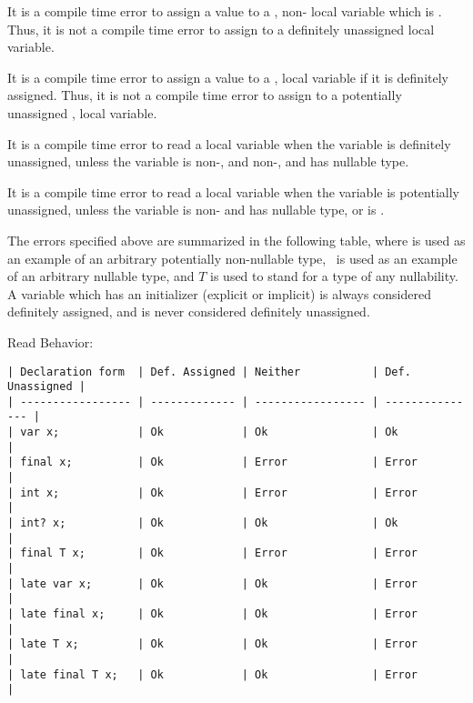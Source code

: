\documentclass[makeidx]{article}
\begin{document}
{It is a compile time error to assign a value to a \FINAL, non-\LATE{} local
variable which is .  Thus, it is not a compile time
error to assign to a definitely unassigned \FINAL{} local variable.

It is a compile time error to assign a value to a \FINAL, \LATE{} local variable
if it is definitely assigned. Thus, it is not a compile time error to
assign to a potentially unassigned \FINAL, \LATE{} local variable.


It is a compile time error to read a local variable when the variable is
definitely unassigned, unless the variable is non-\FINAL, and non-\LATE,
and has nullable type.

It is a compile time error to read a local variable when the variable is
potentially unassigned, unless the variable is non-\FINAL{} and has nullable
type, or is \LATE.

The errors specified above are summarized in the following table, where  is
used as an example of an arbitrary potentially non-nullable type, \ is
used as an example of an arbitrary nullable type, and $T$ is used to stand
for a type of any nullability.  A variable which has an initializer (explicit or
implicit) is always considered definitely assigned, and is never considered
definitely unassigned.

Read Behavior:

\begin{verbatim}
| Declaration form  | Def. Assigned | Neither           | Def. Unassigned |
| ----------------- | ------------- | ----------------- | --------------- |
| var x;            | Ok            | Ok                | Ok              |
| final x;          | Ok            | Error             | Error           |
| int x;            | Ok            | Error             | Error           |
| int? x;           | Ok            | Ok                | Ok              |
| final T x;        | Ok            | Error             | Error           |
| late var x;       | Ok            | Ok                | Error           |
| late final x;     | Ok            | Ok                | Error           |
| late T x;         | Ok            | Ok                | Error           |
| late final T x;   | Ok            | Ok                | Error           |
\end{verbatim}

}
\end{document}
